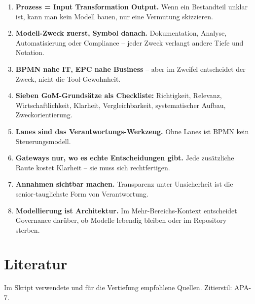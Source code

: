 \documentclass[11pt,a4paper,oneside]{article}
\begin{document}
\begin{enumerate}
  \item \textbf{Prozess = Input \textrightarrow{} Transformation \textrightarrow{} Output.} Wenn ein Bestandteil unklar ist, kann man kein Modell bauen, nur eine Vermutung skizzieren.
  \item \textbf{Modell-Zweck zuerst, Symbol danach.} Dokumentation, Analyse, Automatisierung oder Compliance -- jeder Zweck verlangt andere Tiefe und Notation.
  \item \textbf{BPMN nahe IT, EPC nahe Business} -- aber im Zweifel entscheidet der Zweck, nicht die Tool-Gewohnheit.
  \item \textbf{Sieben GoM-Grundsätze als Checkliste:} Richtigkeit, Relevanz, Wirtschaftlichkeit, Klarheit, Vergleichbarkeit, systematischer Aufbau, Zweckorientierung.
  \item \textbf{Lanes sind das Verantwortungs-Werkzeug.} Ohne Lanes ist BPMN kein Steuerungsmodell.
  \item \textbf{Gateways nur, wo es echte Entscheidungen gibt.} Jede zusätzliche Raute kostet Klarheit -- sie muss sich rechtfertigen.
  \item \textbf{Annahmen sichtbar machen.} Transparenz unter Unsicherheit ist die senior-tauglichste Form von Verantwortung.
  \item \textbf{Modellierung ist Architektur.} Im Mehr-Bereichs-Kontext entscheidet Governance darüber, ob Modelle lebendig bleiben oder im Repository sterben.
\end{enumerate}

\clearpage
\section{Literatur}

Im Skript verwendete und für die Vertiefung empfohlene Quellen. Zitierstil: APA-7.
\end{document}
